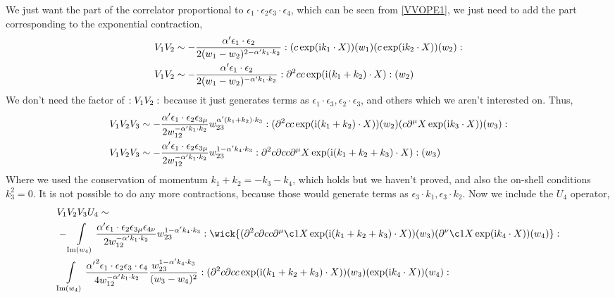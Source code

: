 We just want the part of the correlator proportional to $\epsilon_1\cdot\epsilon_2\epsilon_3\cdot \epsilon_4$, 
which can be seen from \cref{VVOPE1}, we just need to add the part corresponding to the exponential contraction,
\begin{align*}
    V_1V_2&\sim-\frac{\alpha'\epsilon_1\cdot\epsilon_2}{2(w_1-w_2)^{2-\alpha'k_1\cdot k_2}}:\qty(c\exp(\textnormal{i} k_1\cdot X))(w_1)\qty(c\exp(\textnormal{i} k_2\cdot X))(w_2):\\
    V_1V_2&\sim-\frac{\alpha'\epsilon_1\cdot\epsilon_2}{2(w_1-w_2)^{-\alpha'k_1\cdot k_2}}:\partial^2cc\exp(\textnormal{i}(k_1+ k_2)\cdot X):(w_2)
\end{align*}
We don't need the factor of $:V_1V_2:$ because it just generates terms as $\epsilon_1\cdot\epsilon_3,\epsilon_2\cdot\epsilon_3$, 
and others which we aren't interested on. Thus,
\begin{align*}
    V_1V_2V_3&\sim-\frac{\alpha'\epsilon_1\cdot\epsilon_2\epsilon_{3\mu}}{2w_{12}^{-\alpha'k_1\cdot k_2}}w_{23}^{\alpha' (k_1+k_2)\cdot k_3}:(\partial^2cc\exp(\textnormal{i}(k_1+ k_2)\cdot X))(w_2)\qty(c\partial^\mu X\exp(\textnormal{i} k_3\cdot X))(w_3):\\
    V_1V_2V_3&\sim-\frac{\alpha'\epsilon_1\cdot\epsilon_2\epsilon_{3\mu}}{2w_{12}^{-\alpha'k_1\cdot k_2}}w_{23}^{1-\alpha' k_4\cdot k_3}:\partial^2c\partial cc\partial^\mu X\exp(\textnormal{i}(k_1+k_2+ k_3)\cdot X):(w_3)
\end{align*}
Where we used the conservation of momentum $k_1+k_2=-k_3-k_4$, which holds but we haven't proved, and also the on-shell conditions 
$k_3^2=0$. It is not possible to do any more contractions, because those would generate terms as $\epsilon_3\cdot k_1,\epsilon_3\cdot k_2$. 
Now we include the $U_4$ operator,
\begin{align*}
    &V_1V_2V_3U_4\sim\\
    &-\int\limits_{\textnormal{Im}(w_4)}\frac{\alpha'\epsilon_1\cdot\epsilon_2\epsilon_{3\mu}\epsilon_{4\nu}}{2w_{12}^{-\alpha'k_1\cdot k_2}}w_{23}^{1-\alpha' k_4\cdot k_3}\cnord{\wick{(\partial^2c\partial cc\partial^\mu\c1 X\exp(\im(k_1+k_2+ k_3)\cdot X))(w_3)(\partial^\nu\c1 X\exp(\im k_4\cdot X))(w_4)}}\\
    &\int\limits_{\textnormal{Im}(w_4)}\frac{{\alpha'}^2\epsilon_1\cdot\epsilon_2\epsilon_{3}\cdot\epsilon_{4}}{4w_{12}^{-\alpha'k_1\cdot k_2}}\frac{w_{23}^{1-\alpha' k_4\cdot k_3}}{(w_3-w_4)^2}\cnord{{(\partial^2c\partial cc\exp(\im(k_1+k_2+ k_3)\cdot X))(w_3)(\exp(\im k_4\cdot X))(w_4)}}
\end{align*}
